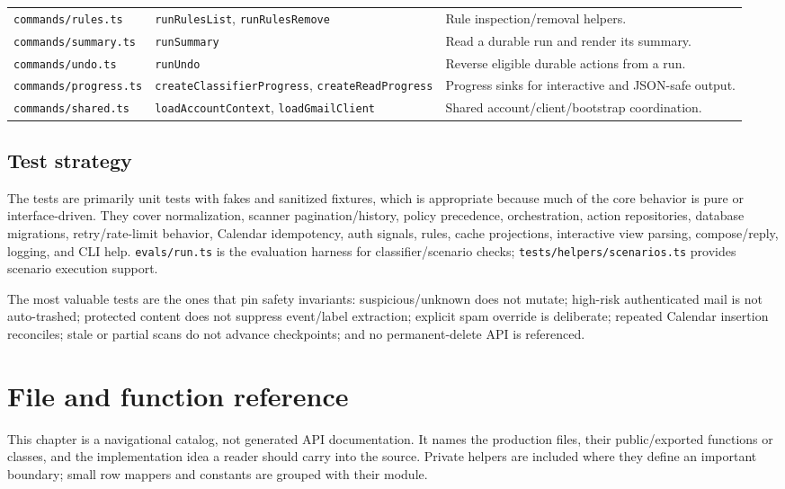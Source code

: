 \documentclass[12pt,oneside]{book}
\newcommand{\code}[1]{\nolinkurl{#1}}
\newcommand{\file}[1]{\nolinkurl{#1}}
\begin{document}
\begin{longtable}{P{3.5cm}P{4.0cm}P{8.0cm}}
\file{commands/rules.ts} & \code{runRulesList}, \code{runRulesRemove} & Rule inspection/removal helpers. \\
\file{commands/summary.ts} & \code{runSummary} & Read a durable run and render its summary. \\
\file{commands/undo.ts} & \code{runUndo} & Reverse eligible durable actions from a run. \\
\file{commands/progress.ts} & \code{createClassifierProgress}, \code{createReadProgress} & Progress sinks for interactive and JSON-safe output. \\
\file{commands/shared.ts} & \code{loadAccountContext}, \code{loadGmailClient} & Shared account/client/bootstrap coordination. \\
\bottomrule
\end{longtable}
\endgroup

\section{Test strategy}

The tests are primarily unit tests with fakes and sanitized fixtures, which is appropriate because much of the core behavior is pure or interface-driven. They cover normalization, scanner pagination/history, policy precedence, orchestration, action repositories, database migrations, retry/rate-limit behavior, Calendar idempotency, auth signals, rules, cache projections, interactive view parsing, compose/reply, logging, and CLI help. \file{evals/run.ts} is the evaluation harness for classifier/scenario checks; \file{tests/helpers/scenarios.ts} provides scenario execution support.

The most valuable tests are the ones that pin safety invariants: suspicious/unknown does not mutate; high-risk authenticated mail is not auto-trashed; protected content does not suppress event/label extraction; explicit spam override is deliberate; repeated Calendar insertion reconciles; stale or partial scans do not advance checkpoints; and no permanent-delete API is referenced.

\chapter{File and function reference}

This chapter is a navigational catalog, not generated API documentation. It names the production files, their public/exported functions or classes, and the implementation idea a reader should carry into the source. Private helpers are included where they define an important boundary; small row mappers and constants are grouped with their module.
\end{document}
